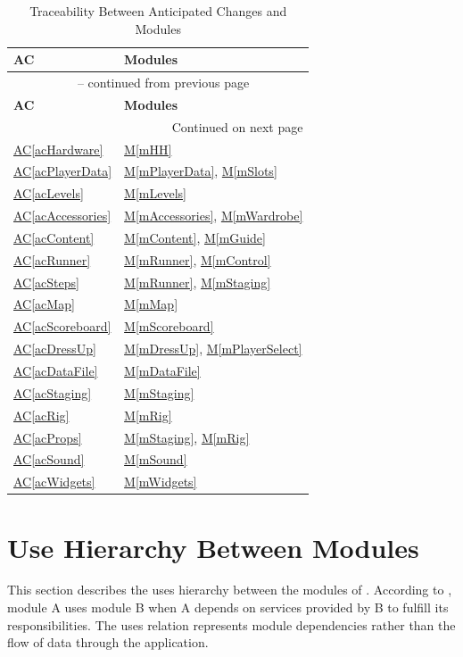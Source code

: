 \documentclass[10pt, titlepage]{article}
\newcommand{\acref}[1]{\hyperref[#1]{AC\ref*{#1}}}
\newcommand{\mref}[1]{\texorpdfstring{\hyperref[md:#1]{M\ref*{#1}}}{M\ref*{#1}}}
\begin{document}
\begin{longtable}{@{}p{}p{}@{}}
\caption{Traceability Between Anticipated Changes and Modules}\label{TblACT}\\
\toprule
\textbf{AC} & \textbf{Modules} \\
\midrule
\endfirsthead
\multicolumn{2}{c}{\tablename\ \thetable{} -- continued from previous page} \\
\toprule
\textbf{AC} & \textbf{Modules} \\
\midrule
\endhead
\midrule
\multicolumn{2}{r}{Continued on next page} \\
\endfoot
\bottomrule
\endlastfoot

\acref{acHardware} & \mref{mHH} \\
\acref{acPlayerData} & \mref{mPlayerData}, \mref{mSlots} \\
\acref{acLevels} & \mref{mLevels} \\
\acref{acAccessories} & \mref{mAccessories}, \mref{mWardrobe} \\
\acref{acContent} & \mref{mContent}, \mref{mGuide} \\
\acref{acRunner} & \mref{mRunner}, \mref{mControl} \\
\acref{acSteps} & \mref{mRunner}, \mref{mStaging} \\
\acref{acMap} & \mref{mMap} \\
\acref{acScoreboard} & \mref{mScoreboard} \\
\acref{acDressUp} & \mref{mDressUp}, \mref{mPlayerSelect} \\
\acref{acDataFile} & \mref{mDataFile} \\
\acref{acStaging} & \mref{mStaging} \\
\acref{acRig} & \mref{mRig} \\
\acref{acProps} & \mref{mStaging}, \mref{mRig} \\
\acref{acSound} & \mref{mSound} \\
\acref{acWidgets} & \mref{mWidgets} \\

\end{longtable}

\newpage
\section{Use Hierarchy Between Modules} \label{SecUse}

This section describes the uses hierarchy between the modules
of \progname{}. According to \cite{Parnas1978}, module A
uses module B when A depends on services provided by B
to fulfill its responsibilities. The uses relation represents
module dependencies rather than the flow of data through
the application.
\end{document}
